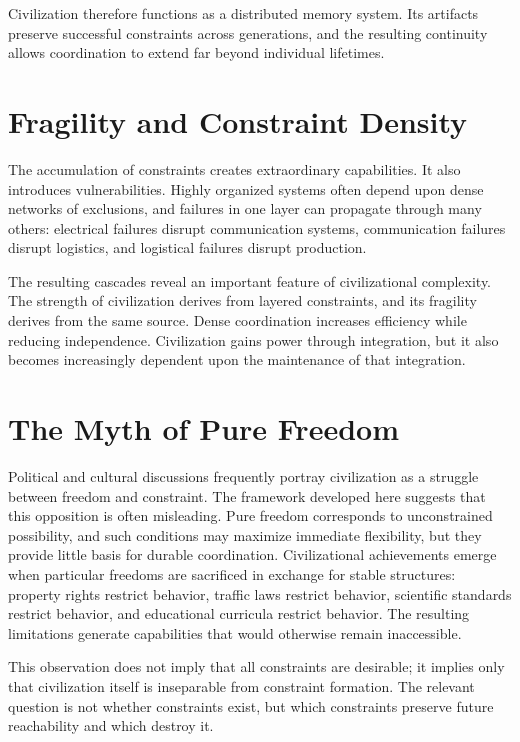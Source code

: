 \documentclass[11pt,oneside]{book}
\theoremstyle{plain}
\theoremstyle{definition}
\theoremstyle{remark}
\begin{document}
Civilization therefore functions as a distributed memory system. Its artifacts preserve successful constraints across generations, and the resulting continuity allows coordination to extend far beyond individual lifetimes.

\section{Fragility and Constraint Density}

The accumulation of constraints creates extraordinary capabilities. It also introduces vulnerabilities. Highly organized systems often depend upon dense networks of exclusions, and failures in one layer can propagate through many others: electrical failures disrupt communication systems, communication failures disrupt logistics, and logistical failures disrupt production.

The resulting cascades reveal an important feature of civilizational complexity. The strength of civilization derives from layered constraints, and its fragility derives from the same source. Dense coordination increases efficiency while reducing independence. Civilization gains power through integration, but it also becomes increasingly dependent upon the maintenance of that integration.

\section{The Myth of Pure Freedom}

Political and cultural discussions frequently portray civilization as a struggle between freedom and constraint. The framework developed here suggests that this opposition is often misleading. Pure freedom corresponds to unconstrained possibility, and such conditions may maximize immediate flexibility, but they provide little basis for durable coordination. Civilizational achievements emerge when particular freedoms are sacrificed in exchange for stable structures: property rights restrict behavior, traffic laws restrict behavior, scientific standards restrict behavior, and educational curricula restrict behavior. The resulting limitations generate capabilities that would otherwise remain inaccessible.

This observation does not imply that all constraints are desirable; it implies only that civilization itself is inseparable from constraint formation. The relevant question is not whether constraints exist, but which constraints preserve future reachability and which destroy it.
\end{document}
